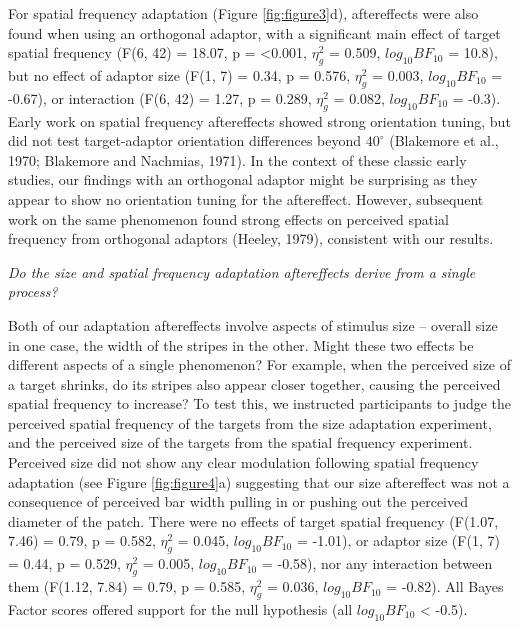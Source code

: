 \documentclass[
]{article}
\begin{document}
For spatial frequency adaptation (Figure \ref{fig:figure3}d), aftereffects were also found when using an orthogonal adaptor, with a significant main effect of target spatial frequency (F(6, 42) = 18.07, p = \textless0.001, \(\eta^2_g\) = 0.509, \(log_{10}BF_{10}\) = 10.8), but no effect of adaptor size (F(1, 7) = 0.34, p = 0.576, \(\eta^2_g\) = 0.003, \(log_{10}BF_{10}\) = -0.67), or interaction (F(6, 42) = 1.27, p = 0.289, \(\eta^2_g\) = 0.082, \(log_{10}BF_{10}\) = -0.3). Early work on spatial frequency aftereffects showed strong orientation tuning, but did not test target-adaptor orientation differences beyond \(40^\circ\) (Blakemore et al., 1970; Blakemore and Nachmias, 1971). In the context of these classic early studies, our findings with an orthogonal adaptor might be surprising as they appear to show no orientation tuning for the aftereffect. However, subsequent work on the same phenomenon found strong effects on perceived spatial frequency from orthogonal adaptors (Heeley, 1979), consistent with our results.

\emph{Do the size and spatial frequency adaptation aftereffects derive from a single process?}

Both of our adaptation aftereffects involve aspects of stimulus size -- overall size in one case, the width of the stripes in the other. Might these two effects be different aspects of a single phenomenon? For example, when the perceived size of a target shrinks, do its stripes also appear closer together, causing the perceived spatial frequency to increase? To test this, we instructed participants to judge the perceived spatial frequency of the targets from the size adaptation experiment, and the perceived size of the targets from the spatial frequency experiment. Perceived size did not show any clear modulation following spatial frequency adaptation (see Figure \ref{fig:figure4}a) suggesting that our size aftereffect was not a consequence of perceived bar width pulling in or pushing out the perceived diameter of the patch. There were no effects of target spatial frequency (F(1.07, 7.46) = 0.79, p = 0.582, \(\eta^2_g\) = 0.045, \(log_{10}BF_{10}\) = -1.01), or adaptor size (F(1, 7) = 0.44, p = 0.529, \(\eta^2_g\) = 0.005, \(log_{10}BF_{10}\) = -0.58), nor any interaction between them (F(1.12, 7.84) = 0.79, p = 0.585, \(\eta^2_g\) = 0.036, \(log_{10}BF_{10}\) = -0.82). All Bayes Factor scores offered support for the null hypothesis (all \(log_{10}BF_{10}\) \textless{} -0.5).
\end{document}
